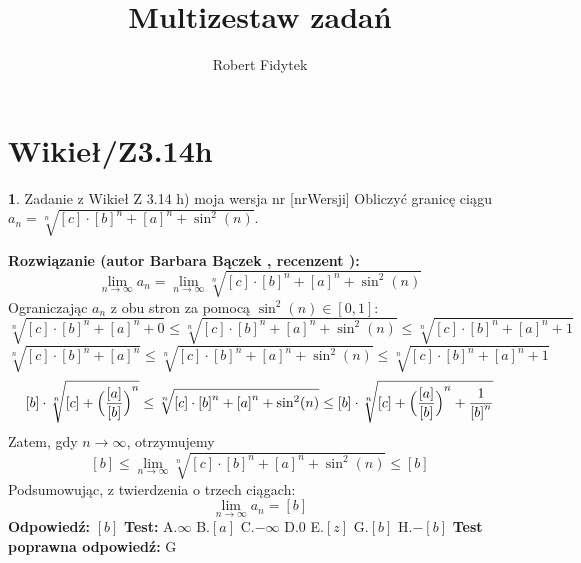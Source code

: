 \documentclass[12pt, a4paper]{article}
\title{Multizestaw zadań}
\author{Robert Fidytek}
\date{}
\theoremstyle{definition} %
\newtheorem{zad}{}
\newcommand{\kategoria}[1]{\section{#1}} %
\newcommand{\zadStart}[1]{\begin{zad}#1\newline} %
\newcommand{\zadStop}{\end{zad}}   %
\newcommand{\rozwStart}[2]{\noindent \textbf{Rozwiązanie (autor #1 , recenzent #2): }\newline} %
\newcommand{\rozwStop}{\newline}                                            %
\newcommand{\odpStart}{\noindent \textbf{Odpowiedź:}\newline}    %
\newcommand{\odpStop}{\newline}                                             %
\newcommand{\testStart}{\noindent \textbf{Test:}\newline} %
\newcommand{\testStop}{\newline} %
\newcommand{\kluczStart}{\noindent \textbf{Test poprawna odpowiedź:}\newline} %
\newcommand{\kluczStop}{\newline} %
\begin{document}
\maketitle


\kategoria{Wikieł/Z3.14h}
\zadStart{Zadanie z Wikieł Z 3.14 h) moja wersja nr [nrWersji]}
Obliczyć granicę ciągu $a_n= \sqrt[n]{[c] \cdot {[b]}^n+{[a]}^n +\sin^2(n)}$.
\zadStop
\rozwStart{Barbara Bączek}{}
$$\lim_{n \rightarrow \infty} a_n= \lim_{n \rightarrow \infty}  \sqrt[n]{[c] \cdot {[b]}^n+{[a]}^n +\sin^2(n)} $$
Ograniczając $a_n$ z obu stron za pomocą $\sin^2(n)\in [0,1]$:
$$\sqrt[n]{[c]\cdot{[b]}^n+{[a]}^n + 0} \leq \sqrt[n]{[c]\cdot{[b]}^n+{[a]}^n +\sin^2(n)} \leq \sqrt[n]{[c]\cdot{[b]}^n+{[a]}^n + 1} $$
$$\sqrt[n]{[c]\cdot{[b]}^n+{[a]}^n} \leq \sqrt[n]{[c]\cdot{[b]}^n+{[a]}^n +\sin^2(n)} \leq \sqrt[n]{[c]\cdot{[b]}^n+{[a]}^n + 1} $$
$$[b] \cdot \sqrt[n]{[c]+ \Big{(}{\frac{[a]}{[b]}\Big{)}}^n} \leq \sqrt[n]{[c]\cdot{[b]}^n+{[a]}^n +\sin^2(n)} \leq [b] \cdot \sqrt[n]{[c]+{\Big{(}\frac{[a]}{[b]}\Big{)}}^n + \frac{1}{{[b]}^n}}$$
Zatem, gdy $n \rightarrow \infty$, otrzymujemy
$$[b] \leq \lim_{n \rightarrow \infty} \sqrt[n]{[c]\cdot{[b]}^n+{[a]}^n +\sin^2(n)} \leq [b] $$
Podsumowując, z twierdzenia o trzech ciągach:  $$\lim_{n \rightarrow \infty} a_n= [b]$$
\rozwStop
\odpStart
$[b]$
\odpStop
\testStart
A.$\infty$
B.$[a]$
C.$-\infty$
D.$0$
E.$[z]$
G.$[b]$
H.$-[b]$
\testStop
\kluczStart
G
\kluczStop
\end{document}

